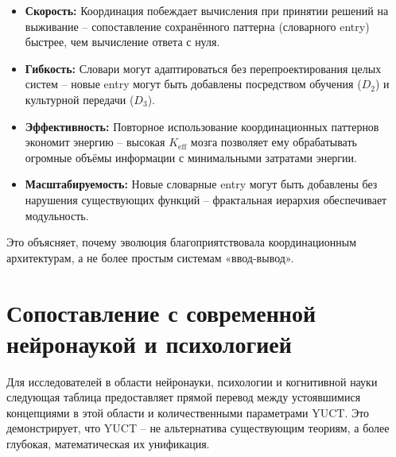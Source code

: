 \documentclass[12pt,a4paper]{article}
\newcommand{\eff}{\mathrm{eff}}
\newcommand{\Ke}{K_{\eff}}
\begin{document}
	\begin{itemize}
		\item \textbf{Скорость:} Координация побеждает вычисления при принятии решений на выживание – сопоставление сохранённого паттерна (словарного entry) быстрее, чем вычисление ответа с нуля.
		\item \textbf{Гибкость:} Словари могут адаптироваться без перепроектирования целых систем – новые entry могут быть добавлены посредством обучения ($D_2$) и культурной передачи ($D_3$).
		\item \textbf{Эффективность:} Повторное использование координационных паттернов экономит энергию – высокая $\Ke$ мозга позволяет ему обрабатывать огромные объёмы информации с минимальными затратами энергии.
		\item \textbf{Масштабируемость:} Новые словарные entry могут быть добавлены без нарушения существующих функций – фрактальная иерархия обеспечивает модульность.
	\end{itemize}
	
	Это объясняет, почему эволюция благоприятствовала координационным архитектурам, а не более простым системам «ввод-вывод».
	
	\section{Сопоставление с современной нейронаукой и психологией}
	
	Для исследователей в области нейронауки, психологии и когнитивной науки следующая таблица предоставляет прямой перевод между устоявшимися концепциями в этой области и количественными параметрами YUCT. Это демонстрирует, что YUCT – не альтернатива существующим теориям, а более глубокая, математическая их унификация.
	
\end{document}
